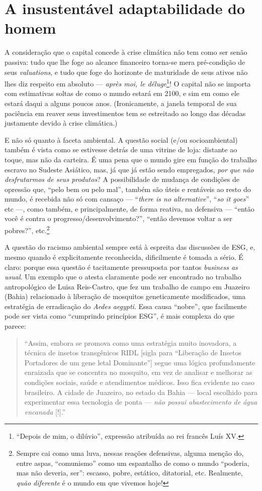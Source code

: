 \documentclass[12pt]{article}
\begin{document}
\section{A insustentável adaptabilidade do homem}
A consideração que o capital concede à crise climática não tem como ser senão passiva: tudo que lhe foge ao alcance financeiro torna-se mera pré-condição de seus \textit{valuations}, e tudo que foge do horizonte de maturidade de seus ativos não lhes diz respeito em absoluto --- \textit{après moi, le déluge}\footnote{``Depois de mim, o dilúvio'', expressão atribuída ao rei francês Luís XV.}! O capital não se importa com estimativas soltas de como o mundo estará em 2100, e sim em como ele estará daqui a alguns poucos anos. (Ironicamente, a janela temporal de sua paciência em reaver seus investimentos tem se estreitado ao longo das décadas justamente devido à crise climática.)

E não só quanto à faceta ambiental. A questão social (e/ou socioambiental) também é vista como se estivesse detrás de uma vitrine de loja: distante ao toque, mas não da carteira. É uma pena que o mundo gire em função do trabalho escravo no Sudeste Asiático, mas, já que já estão sendo empregados, \textit{por que não desfrutarmos de seus produtos}? A possibilidade de mudança de condições de opressão que, ``pelo bem ou pelo mal'', também são úteis e rentáveis ao resto do mundo, é recebida não só com cansaço — ``\textit{there is no alternative}'', ``\textit{so it goes}'' etc —, como também, e principalmente, de forma reativa, na defensiva — ``então você é contra o progresso/desenvolvimento?'', ``então devemos voltar a ser pobres?'', etc.\footnote{Sempre cai como uma luva, nessas reações defensivas, alguma menção do, entre aspas, ``comunismo'' como um espantalho de como o mundo ``poderia, mas não deveria, ser'': escasso, pobre, estático, ditatorial, etc. Realmente, \textit{quão diferente} é o mundo em que vivemos hoje!}

A questão do racismo ambiental sempre está à espreita das discussões de ESG, e, mesmo quando é explicitamente reconhecida, dificilmente é tomada a sério. É claro: porque essa questão é tacitamente pressuposta por tantos \textit{business as usual}. Um exemplo que o atesta claramente pode ser encontrado no trabalho antropológico de Luisa Reis-Castro, que fez um trabalho de campo em Juazeiro (Bahia) relacionado à liberação de mosquitos geneticamente modificados, uma estratégia de erradicação do \textit{Aedes aegypti}. Essa causa ``nobre'', que facilmente pode ser vista como ``cumprindo princípios ESG'', é mais complexa do que parece:
\begin{quote}
    ``Assim, embora se promova como uma estratégia muito inovadora, a técnica de insetos transgênicos RIDL [sigla para ``Liberação de Insetos Portadores de um gene letal Dominante''] segue uma lógica profundamente enraizada que se concentra no mosquito, em vez de analisar e melhorar as condições sociais, saúde e atendimentos médicos. Isso fica evidente no caso brasileiro. A cidade de Juazeiro, no estado da Bahia --- local escolhido para experimentar essa tecnologia de ponta --- \textit{não possui abastecimento de água encanada} [!].'' \cite[p. 124; grifo meu]{Reis-Castro2013}
\end{quote}
\end{document}
